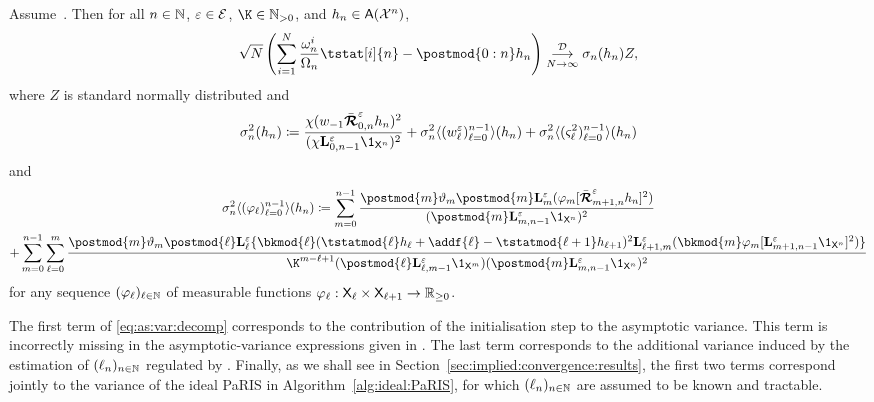 \begin{theorem} \label{cor:clt:pseudo:marginal:paris}
Assume~. Then for all $n \in \mathbb{N}$, $\varepsilon \in \mathcal{E}$, $\K \in \nsetpos$, and $h_n \in \mathsf{A}(\mathcal{X}^n)$, 
$$
 \sqrt{\N} \left( \sum_{i = 1}^\N \frac{\ewght{n}{i}}{\sumwght{n}} \tstat[i]{n} - \postmod{0:n} h_n  \right) 
  \dlim \sigma_n(h_n) Z, 
$$
where $Z$ is standard normally distributed and 
\begin{equation} \label{eq:as:var:decomp}
\sigma^2_n (h_n) \eqdef \frac{\chi(\initwgtfunc \retrokmodmodnorm_{0, n} h_n)^2}{(\chi \ukmod{0, n - 1} \1_{\Xset^n})^2} + \sigma^2_n \langle (\wgtfuncmod{\ell})_{\ell = 0}^{n - 1} \rangle (h_n) + \sigma^2_n \langle (\ukestvar{\ell})_{\ell = 0}^{n - 1} \rangle (h_n) 
\end{equation}
and
\begin{multline} \label{eq:non-recursive:as:var}
\sigma^2_n \langle (\varphi_\ell)_{\ell = 0}^{n - 1} \rangle (h_n) 
\eqdef \sum_{m = 0}^{n - 1} \frac{\postmod{m} \adjfuncforward{m} \postmod{m} \ukmod{m}(\varphi_m [\retrokmodmodnorm_{m + 1, n} h_n ]^2)}{(\postmod{m} \ukmod{m, n - 1} \1_{\Xset^n})^2}\\
+ \sum_{m = 0}^{n - 1} \sum_{\ell = 0}^m \frac{\postmod{m} \adjfuncforward{m} \postmod{\ell} \ukmod{\ell} \{\bkmod{\ell}(\tstatmod{\ell} h_{\ell} + \addf{\ell} - \tstatmod{\ell + 1} h_{\ell +1})^2 \ukmod{\ell + 1, m}( \bkmod{m} \varphi_m [\ukmod{m + 1, n - 1} \1_{\Xset^n}]^2
)\}}{\K^{m - \ell + 1} (\postmod{\ell} \ukmod{\ell, m - 1} \1_{\Xset^m})(\postmod{m} \ukmod{m, n - 1} \1_{\Xset^n})^2}
\end{multline}
for any sequence $(\varphi_\ell)_{\ell \in \mathbb{N}}$ of measurable functions $\varphi_\ell : \mathsf{X}_\ell \times \mathsf{X}_{\ell + 1} \to \mathbb{R}_{\geq 0}$. 
\end{theorem}

\begin{remark}
The first term of \eqref{eq:as:var:decomp} corresponds to the contribution of the initialisation step to the asymptotic variance. This term is incorrectly missing in the asymptotic-variance expressions given in \cite[Theorem~3 and Corollary~5]{olsson:westerborn:2017}. The last term corresponds to the additional variance induced by the estimation of $(\ell_{n})_{n \in \mathbb{N}}$ regulated by . Finally, as we shall see in Section~\ref{sec:implied:convergence:results}, the first two terms correspond jointly to the variance of the ideal PaRIS in Algorithm~\ref{alg:ideal:PaRIS}, for which $(\ell_{n})_{n \in \mathbb{N}}$ are assumed to be known and tractable. 
\end{remark}

